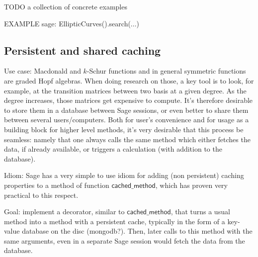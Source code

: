 \documentclass{article}
\newcommand{\TODO}[1]{TODO #1}
\newenvironment{sageexample}{EXAMPLE }{}
\newcommand{\cachedmethod}{$\textsf{cached\_method}$}
\begin{document}
\TODO{a collection of concrete examples}

\begin{sageexample}
  sage: EllipticCurves().search(...)
\end{sageexample}

\subsection{Persistent and shared caching}

Use case: Macdonald and $k$-Schur functions and in general symmetric
functions are graded Hopf algebras. When doing research on those, a
key tool is to look, for example, at the transition matrices between
two basis at a given degree. As the degree increases, those matrices
get expensive to compute. It's therefore desirable to store them in a
database between Sage sessions, or even better to share them between
several users/computers. Both for user's convenience and for usage as
a building block for higher level methods, it's very desirable that
this process be seamless: namely that one always calls the same method
which either fetches the data, if already available, or triggers a
calculation (with addition to the database).

Idiom: Sage has a very simple to use idiom for adding (non persistent)
caching properties to a method of function \cachedmethod,
which has proven very practical to this respect. 

Goal: implement a decorator, similar to \cachedmethod, that turns a
usual method into a method with a persistent cache, typically in the
form of a key-value database on the disc (mongodb?). Then, later calls
to this method with the same arguments, even in a separate Sage
session would fetch the data from the database.
\end{document}
